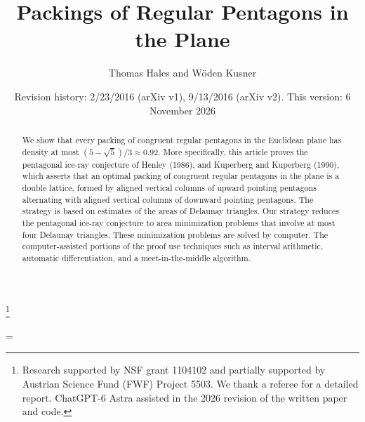 \documentclass{amsart}
\numberwithin{equation}{section}
\numberwithin{figure}{section}
\numberwithin{table}{section}
\theoremstyle{plain}
\theoremstyle{definition}
\theoremstyle{remark}
\begin{document}
\title
    {Packings of Regular Pentagons in the Plane}
\author{Thomas Hales and W\"oden Kusner}
\date{Revision history: 2/23/2016 (arXiv v1), 9/13/2016 (arXiv v2). This version: 6 November 2026}
\thanks{Research supported by NSF grant 1104102 and partially supported by Austrian Science Fund (FWF) Project 5503. We thank a referee for a detailed report. ChatGPT-6 Astra assisted in the
2026 revision of the written paper and code.}

\begin{abstract}  
We show that every packing of congruent regular pentagons in the Euclidean plane has
density at most $(5-\sqrt5)/3\approx 0.92$.     More specifically,
this article proves the pentagonal ice-ray
conjecture of Henley (1986), and Kuperberg and Kuperberg (1990), 
which asserts that an optimal packing of congruent regular pentagons in the plane is a double lattice,
formed by aligned vertical columns of upward pointing pentagons alternating
with aligned vertical columns of downward pointing pentagons.  The strategy is based on estimates
of the areas of Delaunay triangles.  Our strategy reduces the pentagonal ice-ray conjecture to
area minimization problems that involve at most four Delaunay triangles.  These minimization problems
are solved by computer.  The computer-assisted portions of the proof use techniques such as
interval arithmetic, automatic differentiation, and a meet-in-the-middle algorithm.
\end{abstract}


\parskip=\baselineskip

 \maketitle



    


      
%
      
       
%
      
      
%





%
\end{document}
